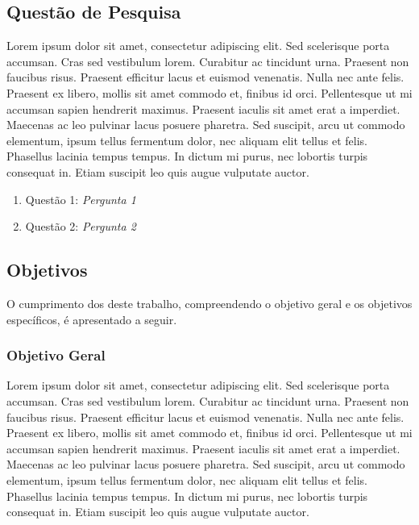 \subsection{Questão de Pesquisa}
\label{status-pesquisa}

Lorem ipsum dolor sit amet, consectetur adipiscing elit. Sed scelerisque porta accumsan. Cras sed vestibulum lorem. Curabitur ac tincidunt urna. Praesent non faucibus risus. Praesent efficitur lacus et euismod venenatis. Nulla nec ante felis. Praesent ex libero, mollis sit amet commodo et, finibus id orci. Pellentesque ut mi accumsan sapien hendrerit maximus. Praesent iaculis sit amet erat a imperdiet. Maecenas ac leo pulvinar lacus posuere pharetra. Sed suscipit, arcu ut commodo elementum, ipsum tellus fermentum dolor, nec aliquam elit tellus et felis. Phasellus lacinia tempus tempus. In dictum mi purus, nec lobortis turpis consequat in. Etiam suscipit leo quis augue vulputate auctor.

\begin{enumerate}
	\item Questão 1: \textit{Pergunta 1}
	\item Questão 2: \textit{Pergunta 2}
\end{enumerate}

\subsection{Objetivos}
\label{status-objetivos}

O cumprimento dos  deste trabalho, compreendendo o objetivo geral e os objetivos específicos, é apresentado a seguir.

\subsubsection{Objetivo Geral}
\label{status-objetivo-geral}

Lorem ipsum dolor sit amet, consectetur adipiscing elit. Sed scelerisque porta accumsan. Cras sed vestibulum lorem. Curabitur ac tincidunt urna. Praesent non faucibus risus. Praesent efficitur lacus et euismod venenatis. Nulla nec ante felis. Praesent ex libero, mollis sit amet commodo et, finibus id orci. Pellentesque ut mi accumsan sapien hendrerit maximus. Praesent iaculis sit amet erat a imperdiet. Maecenas ac leo pulvinar lacus posuere pharetra. Sed suscipit, arcu ut commodo elementum, ipsum tellus fermentum dolor, nec aliquam elit tellus et felis. Phasellus lacinia tempus tempus. In dictum mi purus, nec lobortis turpis consequat in. Etiam suscipit leo quis augue vulputate auctor.

